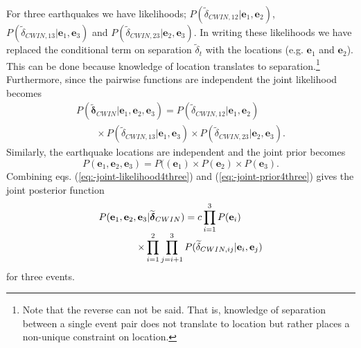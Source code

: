 \documentclass[extra]{gji}
\begin{document}
For three earthquakes we have likelihoods;
$P(\widetilde{\delta}_{CWIN,12}|\mathbf{e}_1, \mathbf{e}_2)$,
$P(\widetilde{\delta}_{CWIN,13}|\mathbf{e}_1, \mathbf{e}_3)$
and
$P(\widetilde{\delta}_{CWIN,23}|\mathbf{e}_2, \mathbf{e}_3)$.
In writing
these likelihoods we have replaced the conditional term on separation
$\widetilde{\delta}_t$ with the locations (e.g. $\mathbf{e}_1$ and $\mathbf{e}_2$).
This can be done because
knowledge of location translates to separation.\footnote{Note that the reverse
can not be said. That is, knowledge of separation between a single event pair
does not translate to location but rather places a non-unique constraint on
location.}
Furthermore, since the pairwise functions are independent the joint
likelihood becomes
\begin{equation}
\begin{array}{l}
\label{eq:-joint-likelihood4three}
P(\widetilde{\mathbf{\delta}}_{CWIN} | \mathbf{e}_1, \mathbf{e}_2, \mathbf{e}_3) =
P(\widetilde{\delta}_{CWIN,12} | \mathbf{e}_1, \mathbf{e}_2) \\
\hspace{2em} \times P(\widetilde{\delta}_{CWIN,13} | \mathbf{e}_1, \mathbf{e}_3)
\times  P(\widetilde{\delta}_{CWIN,23} | \mathbf{e}_2, \mathbf{e}_3).
\end{array}
\end{equation}
Similarly, the earthquake locations are independent and the
joint prior becomes
\begin{equation}
\label{eq:-joint-prior4three}
P(\mathbf{e}_1, \mathbf{e}_2, \mathbf{e}_3) = P((\mathbf{e}_1) \times P(\mathbf{e}_2) \times P(\mathbf{e}_3).
\end{equation}
Combining eqs. (\ref{eq:-joint-likelihood4three}) and (\ref{eq:-joint-prior4three})
gives the joint posterior function
\begin{equation}
\label{eq-3eqposterior}
\begin{array}{l}
P(\mathbf{e}_1, \mathbf{e}_2, \mathbf{e}_3 | \widetilde{\mitbf{\delta}}_{CWIN}) = c \displaystyle \prod_{i=1}^3 P(\mathbf{e}_i) \\
\hspace{4em}  \times \displaystyle \prod_{i=1}^2 \prod_{j=i+1}^3 P(\widetilde{\delta}_{CWIN,ij}|\mathbf{e}_i,\mathbf{e}_j)
\end{array}
\end{equation}
for three events. 
\end{document}
